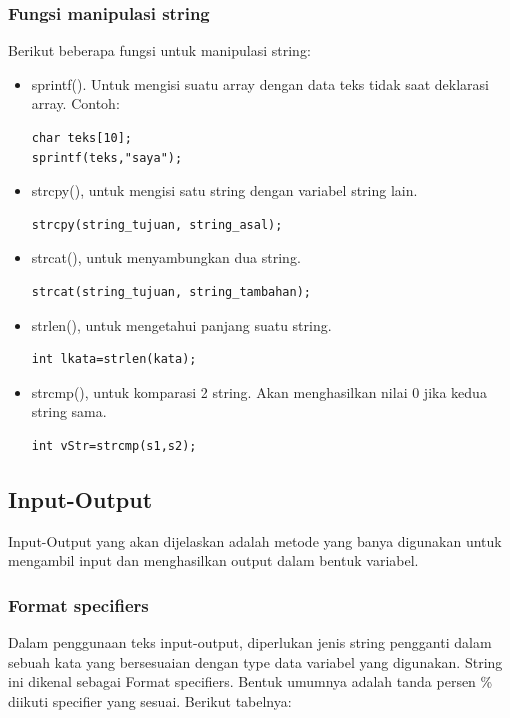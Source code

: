 \documentclass[12pt,]{article}
\begin{document}
	\subsubsection{Fungsi manipulasi string}
	Berikut beberapa fungsi untuk manipulasi string:
	\begin{itemize}
		\item sprintf(). Untuk mengisi suatu array dengan data teks tidak saat deklarasi array.
		Contoh:
		\begin{verbatim}
char teks[10];
sprintf(teks,"saya");
		\end{verbatim}
		
		\item strcpy(), untuk mengisi satu string dengan variabel string lain.
		\begin{verbatim}
strcpy(string_tujuan, string_asal);
		\end{verbatim}
		
		\item strcat(), untuk menyambungkan dua string.
		\begin{verbatim}
strcat(string_tujuan, string_tambahan);
		\end{verbatim}
		
		\item strlen(), untuk mengetahui panjang suatu string.
		\begin{verbatim}
int lkata=strlen(kata);
		\end{verbatim}
		
		\item strcmp(), untuk komparasi 2 string.
		Akan menghasilkan nilai 0 jika kedua string sama.
		\begin{verbatim}
int vStr=strcmp(s1,s2);
		\end{verbatim}
	\end{itemize}
	
	\newpage
	\subsection{Input-Output}
	Input-Output yang akan dijelaskan adalah metode yang banya digunakan untuk mengambil input dan menghasilkan output dalam bentuk variabel.
		
	\subsubsection{Format specifiers}
	Dalam penggunaan teks input-output, diperlukan jenis string pengganti dalam sebuah kata yang bersesuaian dengan type data variabel yang digunakan.
	String ini dikenal sebagai Format specifiers.
	Bentuk umumnya adalah tanda persen \% diikuti specifier yang sesuai.
	Berikut tabelnya:
	
\end{document}
